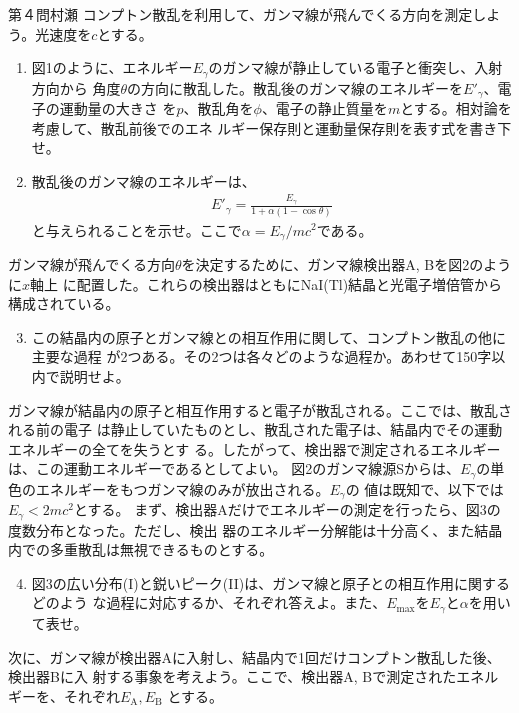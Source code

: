 \begin{question}{第４問}{村瀬}
\def\Eg{E_\gamma}
コンプトン散乱を利用して、ガンマ線が飛んでくる方向を測定しよう。光速度を$c$とする。
\begin{enumerate}
\item
  図1のように、エネルギー$\Eg$のガンマ線が静止している電子と衝突し、入射方向から
  角度$\theta$の方向に散乱した。散乱後のガンマ線のエネルギーを$E'_\gamma$、電子の運動量の大きさ
  を$p$、散乱角を$\phi$、電子の静止質量を$m$とする。相対論を考慮して、散乱前後でのエネ
  ルギー保存則と運動量保存則を表す式を書き下せ。
\item
  散乱後のガンマ線のエネルギーは、
  \begin{align}
    E'_\gamma = \frac{\Eg}{1+\alpha(1-\cos\theta)}
  \end{align}
  と与えられることを示せ。ここで$\alpha=\Eg/mc^2$である。
\end{enumerate}
ガンマ線が飛んでくる方向$\theta$を決定するために、ガンマ線検出器A, Bを図2のように$x$軸上
に配置した。これらの検出器はともにNaI(Tl)結晶と光電子増倍管から構成されている。
\begin{enumerate}
\setcounter{enumi}{2}
\item
  この結晶内の原子とガンマ線との相互作用に関して、コンプトン散乱の他に主要な過程
  が2つある。その2つは各々どのような過程か。あわせて150字以内で説明せよ。
\end{enumerate}
ガンマ線が結晶内の原子と相互作用すると電子が散乱される。ここでは、散乱される前の電子
は静止していたものとし、散乱された電子は、結晶内でその運動エネルギーの全てを失うとす
る。したがって、検出器で測定されるエネルギーは、この運動エネルギーであるとしてよい。
図2のガンマ線源Sからは、$\Eg$の単色のエネルギーをもつガンマ線のみが放出される。$\Eg$の
値は既知で、以下では$\Eg<2mc^2$とする。
まず、検出器Aだけでエネルギーの測定を行ったら、図3の度数分布となった。ただし、検出
器のエネルギー分解能は十分高く、また結晶内での多重散乱は無視できるものとする。
\begin{enumerate}
\setcounter{enumi}{3}
\item
  図3の広い分布(I)と鋭いピーク(II)は、ガンマ線と原子との相互作用に関するどのよう
  な過程に対応するか、それぞれ答えよ。また、$E_\mathrm{max}$を$\Eg$と$\alpha$を用いて表せ。
\end{enumerate}
次に、ガンマ線が検出器Aに入射し、結晶内で1回だけコンプトン散乱した後、検出器Bに入
射する事象を考えよう。ここで、検出器A, Bで測定されたエネルギーを、それぞれ$E_\mathrm{A}, E_\mathrm{B}$
とする。
\begin{enumerate}

\end{enumerate}
\end{question}
